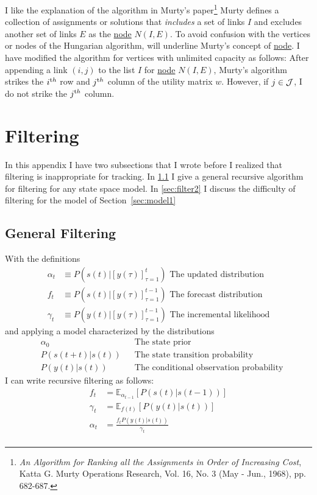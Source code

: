\documentclass[12pt]{article}
\newcommand{\field}[1]{\mathbb{#1}}
\newcommand{\EV}[2]{\field{E}_{#1}\left[#2\right]}
\newcommand{\os}[4]{{\left[ #1(#2) \right]}_{#3}^{#4}} %
\newcommand{\ti}[2]{{#1}{(#2)}}                         %
\newcommand{\ts}[4]{\os{#1}{#2}{#2=#3}{#4}} %
\begin{document}
I like the explanation of the algorithm in Murty's
paper\footnote{\emph{An Algorithm for Ranking all the Assignments in
    Order of Increasing Cost}, Katta G.  Murty Operations Research,
  Vol. 16, No. 3 (May - Jun., 1968), pp.  682-687.}  Murty defines a
collection of assignments or solutions that \emph{includes} a set of
links $I$ and excludes another set of links $E$ as the
\underline{node} $N(I,E)$.  To avoid confusion with the vertices or
nodes of the Hungarian algorithm, will underline Murty's concept of
\underline{node}.  I have modified the algorithm for vertices with
unlimited capacity as follows: After appending a link $(i,j)$ to the
list $I$ for \underline{node} $N(I,E)$, Murty's algorithm strikes the
$i^{\text th}$ row and $j^{\text th}$ column of the utility matrix
$w$.  However, if $j\in {\cal J}$, I do not strike the $j^{\text th}$
column.

\section{Filtering}
\label{sec:filtering}

In this appendix I have two subsections that I wrote before I
realized that filtering is inappropriate for tracking.  In
\ref{sec:filtering1} I give a general recursive algorithm for filtering
for any state space model.  In \ref{sec:filter2} I discuss the
difficulty of filtering for the model of Section~\ref{sec:model1}


\subsection{General Filtering}
\label{sec:filtering1}

With the definitions
\begin{align}
  \label{def:alpha}
  \alpha_t &\equiv P(\ti{s}{t}|\ts{y}{\tau}{1}{t}) \text{ The updated distribution} \\
  f_t &\equiv P(\ti{s}{t}|\ts{y}{\tau}{1}{t-1}) \text{ The forecast
    distribution} \\
  \gamma_t &\equiv P(\ti{y}{t}|\ts{y}{\tau}{1}{t-1}) \text{ The
    incremental likelihood}
\end{align}
and applying a model characterized by the distributions
\begin{align}
  \label{def:alpha0}
  &\alpha_0  &&\text{The state prior} \\
  &P(\ti{s}{t+t}|\ti{s}{t}) &&\text{The state transition probability} \\
  &P(\ti{y}{t}|\ti{s}{t}) &&\text{The conditional observation probability}
\end{align}
I can write recursive filtering as follows:
\begin{align}
  f_t &= \EV{\alpha_{t-1}} {P(\ti{s}{t}|\ti{s}{t-1})} \\
  \gamma_t &= \EV{\ti{f}{t}} {P(\ti{y}{t}|\ti{s}{t})} \\
  \alpha_t &= \frac{f_t P(\ti{y}{t}|\ti{s}{t})}{\gamma_t} \\
\end{align}
\end{document}
